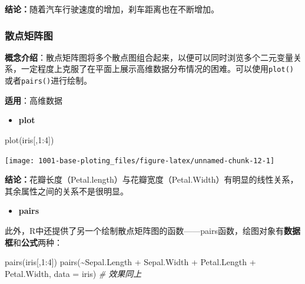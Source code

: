 \documentclass[
]{book}
\newenvironment{Shaded}{\begin{snugshade}}{\end{snugshade}}
\newcommand{\AttributeTok}[1]{\textcolor[rgb]{0.77,0.63,0.00}{#1}}
\newcommand{\CommentTok}[1]{\textcolor[rgb]{0.56,0.35,0.01}{\textit{#1}}}
\newcommand{\DecValTok}[1]{\textcolor[rgb]{0.00,0.00,0.81}{#1}}
\newcommand{\FunctionTok}[1]{\textcolor[rgb]{0.00,0.00,0.00}{#1}}
\newcommand{\NormalTok}[1]{#1}
\newcommand{\SpecialCharTok}[1]{\textcolor[rgb]{0.00,0.00,0.00}{#1}}
\providecommand{\tightlist}{%
  \setlength{\itemsep}{0pt}\setlength{\parskip}{0pt}}
\begin{document}
\textbf{结论：}随着汽车行驶速度的增加，刹车距离也在不断增加。

\hypertarget{ux6563ux70b9ux77e9ux9635ux56fe}{%
\subsubsection{散点矩阵图}\label{ux6563ux70b9ux77e9ux9635ux56fe}}

\textbf{概念介绍}：散点矩阵图将多个散点图组合起来，以便可以同时浏览多个二元变量关系，一定程度上克服了在平面上展示高维数据分布情况的困难。可以使用\texttt{plot()}或者\texttt{pairs()}进行绘制。

\textbf{适用}：高维数据

\begin{itemize}
\tightlist
\item
  \textbf{plot}
\end{itemize}

\begin{Shaded}
\begin{Highlighting}[]
\FunctionTok{plot}\NormalTok{(iris[,}\DecValTok{1}\SpecialCharTok{:}\DecValTok{4}\NormalTok{]) }
\end{Highlighting}
\end{Shaded}

\begin{center}\texttt{[image: 1001-base-ploting\_files/figure-latex/unnamed-chunk-12-1]} \end{center}

\textbf{结论：}花瓣长度（Petal.length）与花瓣宽度（Petal.Width）有明显的线性关系，其余属性之间的关系不是很明显。

\begin{itemize}
\tightlist
\item
  \textbf{pairs}
\end{itemize}

此外，R中还提供了另一个绘制散点矩阵图的函数------pairs函数，绘图对象有\textbf{数据框}和\textbf{公式}两种：

\begin{Shaded}
\begin{Highlighting}[]
\FunctionTok{pairs}\NormalTok{(iris[,}\DecValTok{1}\SpecialCharTok{:}\DecValTok{4}\NormalTok{])}
\FunctionTok{pairs}\NormalTok{(}\SpecialCharTok{\textasciitilde{}}\NormalTok{Sepal.Length }\SpecialCharTok{+}\NormalTok{ Sepal.Width }\SpecialCharTok{+}\NormalTok{ Petal.Length }\SpecialCharTok{+}\NormalTok{ Petal.Width, }\AttributeTok{data =}\NormalTok{ iris)  }\CommentTok{\# 效果同上}
\end{Highlighting}
\end{Shaded}
\end{document}
